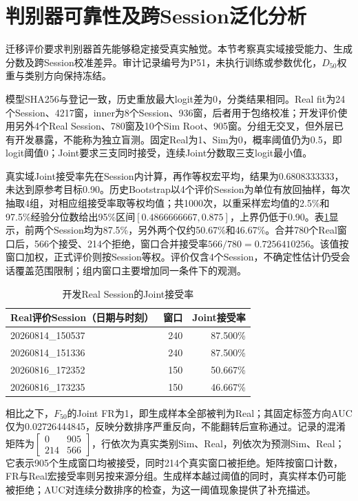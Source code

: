 \section{判别器可靠性及跨Session泛化分析}
\label{sec:ch06_discriminator_reliability}

迁移评价要求判别器首先能够稳定接受真实触觉。本节考察真实域接受能力、生成分数及跨Session校准差异。审计记录编号为P51，未执行训练或参数优化，$D_{50}$权重与类别方向保持冻结。

模型SHA256与登记一致，历史重放最大logit差为0，分类结果相同。Real fit为24个Session、4217窗，inner为8个Session、936窗，后者用于包络校准；开发评价使用另外4个Real Session、780窗及10个Sim Root、905窗。分组无交叉，但外层已有开发暴露，不能称为独立盲测。固定Real为1、Sim为0，概率阈值仍为0.5，即logit阈值0；Joint要求三支同时接受，连续Joint分数取三支logit最小值。

真实域Joint接受率先在Session内计算，再作等权宏平均，结果为0.6808333333，未达到原参考目标0.90。历史Bootstrap以4个评价Session为单位有放回抽样，每次抽取4组，对相应组接受率取等权均值；共1000次，以重采样宏均值的2.5\%和97.5\%经验分位数给出95\%区间$[0.4866666667,0.875]$，上界仍低于0.90。表\ref{tab:ch06_real_session_reliability}显示，前两个Session均为87.5\%，另外两个仅约50.67\%和46.67\%。合并780个Real窗口后，566个接受、214个拒绝，窗口合并接受率$566/780=0.7256410256$。该值按窗口加权，正式评价则按Session等权。评价仅含4个Session，不确定性估计仍受会话覆盖范围限制；组内窗口主要增加同一条件下的观测。

\begin{table}[htbp]
\centering
\caption{开发Real Session的Joint接受率}
\label{tab:ch06_real_session_reliability}
\begin{tabular}{lrr}
\toprule
Real评价Session（日期与时刻） & 窗口 & Joint接受率\\
\midrule
20260814\_150537 & 240 & 87.500\%\\
20260814\_151336 & 240 & 87.500\%\\
20260816\_172352 & 150 & 50.667\%\\
20260816\_173235 & 150 & 46.667\%\\
\bottomrule
\end{tabular}
\end{table}

相比之下，$F_{50}$的Joint FR为1，即生成样本全部被判为Real；其固定标签方向AUC仅为0.02726444845，反映分数排序严重反向，不能翻转后宣称通过。记录的混淆矩阵为$\left[\begin{smallmatrix}0&905\\214&566\end{smallmatrix}\right]$，行依次为真实类别Sim、Real，列依次为预测Sim、Real；它表示905个生成窗口均被接受，同时214个真实窗口被拒绝。矩阵按窗口计数，FR与Real宏接受率则另按来源分组。生成样本越过阈值的同时，真实样本仍可能被拒绝；AUC对连续分数排序的检查，为这一阈值现象提供了补充描述。

